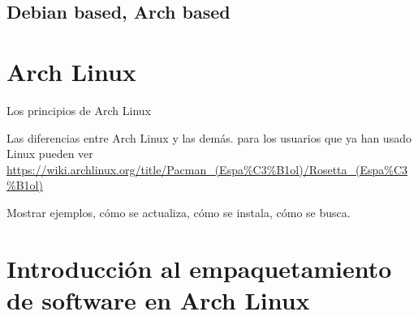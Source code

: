 \subsection{Debian based, Arch based}


\section{Arch Linux}


Los principios de Arch Linux

Las diferencias entre Arch Linux y las demás.
para los usuarios que ya han usado Linux pueden ver \url{https://wiki.archlinux.org/title/Pacman_(Espa%C3%B1ol)/Rosetta_(Espa%C3%B1ol)}

Mostrar ejemplos, cómo se actualiza, cómo se instala, cómo se busca.


\section{Introducción al empaquetamiento de software en Arch Linux}

